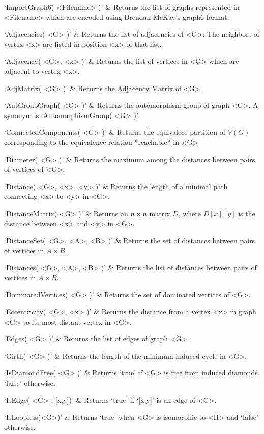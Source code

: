 `ImportGraph6( <Filename> )' &
Returns the list of graphs represented in <Filename> which are encoded using Brendan McKay's graph6 format. 
\enditems



\beginitems
`Adjacencies( <G> )' & 
Returns the list of adjacencies of <G>: The neighbors of vertex <x> are listed in position <x> of that list.

`Adjacency( <G>, <x> )' & 
Returns the list of vertices in <G> which are adjacent to vertex <x>.

`AdjMatrix( <G> )' & 
Returns the Adjacency Matrix of <G>.

`AutGroupGraph( <G> )' & 
Returns the automorphism group of graph <G>. A synonym is `AutomorphismGroup( <G> )'.

`ConnectedComponents( <G> )' & 
Returns the equivalece partition of $V(G)$ corresponding to the equivalence relation *reachable* in <G>.

`Diameter( <G> )' & 
Returns the maximum among the distances between pairs of vertices of <G>.

`Distance( <G>, <x>, <y> )' & 
Returns the length of a minimal path connecting <x> to <y> in <G>.

`DistanceMatrix( <G> )' & 
Returns an $n\times n$ matrix $D$, where $D[x][y]$ is the distance between <x> and <y> in <G>.

`DistanceSet( <G>, <A>, <B> )' & 
Returns the set of distances between pairs of vertices in $A\times B$.

`Distances( <G>, <A>, <B> )' & 
Returns the list of distances between pairs of vertices in $A\times B$.

`DominatedVertices( <G> )' & 
Returns the set of dominated vertices of <G>.

`Eccentricity( <G>, <x> )' & 
Returns  the  distance  from a vertex <x> in graph <G> to its most distant vertex in <G>.

`Edges( <G> )' & 
Returns the list of edges of graph <G>.

`Girth( <G> )' &
Returns the length of the minimum induced cycle in <G>.

`IsDiamondFree( <G> )' & 
Returns `true' if <G> is free from induced diamonds, `false' otherwise.

`IsEdge( <G> , [x,y])' & 
Returns `true' if `[x,y]' is an edge of <G>.

`IsLoopless(<G>)' & 
Returns `true' when <G> is isomorphic to <H> and `false' otherwise.

